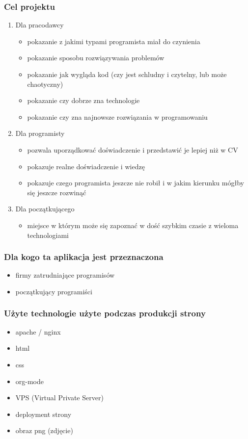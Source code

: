 \documentclass[11pt]{article}
\begin{document}
\subsubsection{Cel projektu}
\label{sec:org86d683e}
\begin{enumerate}
\item Dla pracodawcy
\label{sec:orge224cf2}
\begin{itemize}
\item pokazanie z jakimi typami programista miał do czynienia
\item pokazanie sposobu rozwiązywania problemów
\item pokazanie jak wygląda kod (czy jest schludny i czytelny, lub może chaotyczny)
\item pokazanie czy dobrze zna technologie
\item pokazanie czy zna najnowsze rozwiązania w programowaniu
\end{itemize}
\item Dla programisty
\label{sec:orgc3b125f}
\begin{itemize}
\item pozwala uporządkować doświadczenie i przedstawić je lepiej niż w CV
\item pokazuje realne doświadczenie i wiedzę
\item pokazuje czego programista jeszcze nie robił i w jakim kierunku mógłby się jeszcze rozwinąć
\end{itemize}
\item Dla początkującego
\label{sec:org4f08aa9}
\begin{itemize}
\item miejsce w którym może się zapoznać w dość szybkim czasie z wieloma technologiami
\end{itemize}
\end{enumerate}
\subsubsection{Dla kogo ta aplikacja jest przeznaczona}
\label{sec:org92c1309}
\begin{itemize}
\item firmy zatrudniające programisów
\item początkujący programiści
\end{itemize}
\subsubsection{Użyte technologie użyte podczas produkcji strony}
\label{sec:org9955c1b}
\begin{itemize}
\item apache / nginx
\item html
\item css
\item org-mode
\item VPS (Virtual Private Server)
\item deployment strony
\item obraz png (zdjęcie)
\end{itemize}
\end{document}
